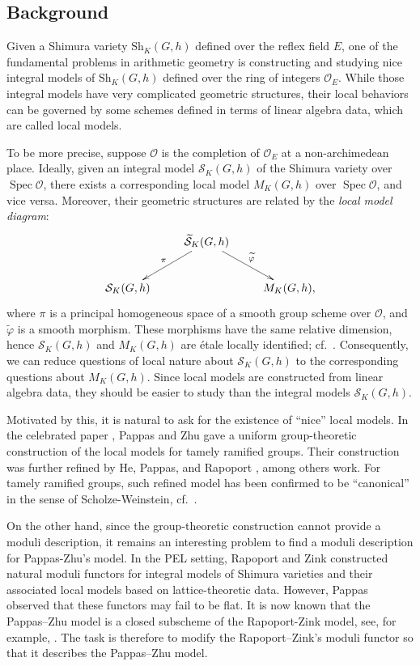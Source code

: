 \documentclass[pdflatex,sn-mathphys-num]{sn-jnl}%
\theoremstyle{thmstyleone}%
\theoremstyle{thmstyletwo}%
\numberwithin{equation}{subsection}
\theoremstyle{thmstylethree}%
\newcommand{\CO}{\ensuremath{\mathcal{O}}\xspace}
\newcommand{\CS}{\ensuremath{\mathcal{S}}\xspace}
\newcommand{\Sh}{\mathrm{Sh}}
\DeclareMathOperator{\Spec}{Spec}
\newcommand{\wt}{\widetilde}
\begin{document}
\subsection{Background}\label{intro_back}
Given a Shimura variety $\Sh_K(G,h)$ defined over the reflex field $E$, one of the fundamental problems in arithmetic geometry is constructing and studying nice integral models of $\Sh_K(G,h)$ defined over the ring of integers $\CO_E$.
While those integral models have very complicated geometric structures, their local behaviors can be governed by some schemes defined in terms of linear algebra data, which are called local models.
	
To be more precise, suppose $\CO$ is the completion of $\CO_E$ at a non-archimedean place. Ideally, given an integral model $\CS_K(G,h)$ of the Shimura variety over $\Spec \CO$, there exists a corresponding local model $M_K(G,h)$ over $\Spec \CO$, and vice versa.
Moreover, their geometric structures are related by the \emph{local model diagram}:
\begin{equation*}
\begin{aligned}
\xymatrix{
&\wt{\CS}_K(G,h)\ar[ld]_-{\pi}\ar[dr]^-{\wt{\varphi}}\\
\CS_K(G,h) &&  M_K(G,h),
}
\end{aligned}
\end{equation*}
where $\pi$ is a principal homogeneous space of a smooth group scheme over $\CO$, and $\wt{\varphi}$ is a smooth morphism. 
These morphisms have the same relative dimension, hence $\CS_K(G,h)$ and $M_K(G,h)$ are \'etale locally identified; cf.\ \cite{RZ}.
Consequently, we can reduce questions of local nature about $\CS_K(G,h)$ to the corresponding questions about $M_K(G,h)$.
Since local models are constructed from linear algebra data, they should be easier to study than the integral models $\CS_K(G,h)$.

Motivated by this, it is natural to ask for the existence of ``nice'' local models.
In the celebrated paper \cite{PZ2013}, Pappas and Zhu gave a uniform group-theoretic construction of the local models for tamely ramified groups. Their construction was further refined by He, Pappas, and Rapoport \cite{HPR}, among others work. For tamely ramified groups, such refined model has been confirmed to be ``canonical'' in the sense of Scholze-Weinstein, cf.\, \cite[Corollary 2.17]{HPR}.

On the other hand, since the group-theoretic construction cannot provide a moduli description, it remains an interesting problem to find a moduli description for Pappas-Zhu's model.
In the PEL setting, Rapoport and Zink \cite{RZ} constructed natural moduli functors for integral models of Shimura varieties and their associated local models based on lattice-theoretic data. 
However, Pappas \cite{Pappas2000} observed that these functors may fail to be flat.
It is now known that the Pappas–Zhu model is a closed subscheme of the Rapoport-Zink model, see, for example, \cite[Lemma 4.1]{HPR}. 
The task is therefore to modify the Rapoport–Zink's moduli functor so that it describes the Pappas–Zhu model.
\end{document}
